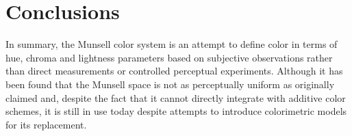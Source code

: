 \documentclass[10pt,twocolumn,letterpaper]{article}
\begin{document}
\section{Conclusions}
In summary, the Munsell color system is an attempt to define color in terms of hue, chroma and lightness parameters based on subjective observations rather than direct measurements or controlled perceptual experiments. Although it has been found that the Munsell space is not as perceptually uniform as originally claimed and, despite the fact that it cannot directly integrate with additive color schemes, it is still in use today despite attempts to introduce colorimetric models for its replacement.
{\small


}
\end{document}
